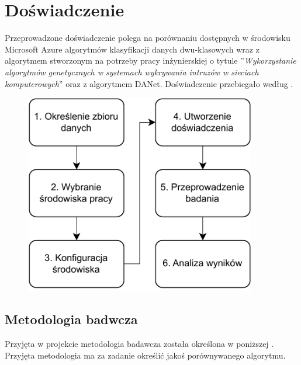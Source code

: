 \chapter{Doświadczenie}
Przeprowadzone doświadczenie polega na porównaniu dostępnych w środowisku Microsoft Azure algorytmów klasyfikacji danych dwu-klasowych wraz z algorytmem stworzonym na potrzeby pracy inżynierskiej o tytule ''\textit{Wykorzystanie algorytmów genetycznych w systemach wykrywania intruzów w sieciach komputerowych}''\cite{Blyszcz2022} oraz z algorytmem DANet\cite{Chen2022}. Doświadczenie przebiegało według .

\begin{figure}[H]
    \centering
    \includegraphics[width=0.9\textwidth]{images/schemat_pracy}
    \label{fig:sch-prac}
\end{figure}

\section{Metodologia badwcza}
Przyjęta w projekcie metodologia badawcza została określona w poniższej . Przyjęta metodologia ma za zadanie określić jakoś porównywanego algorytmu.

